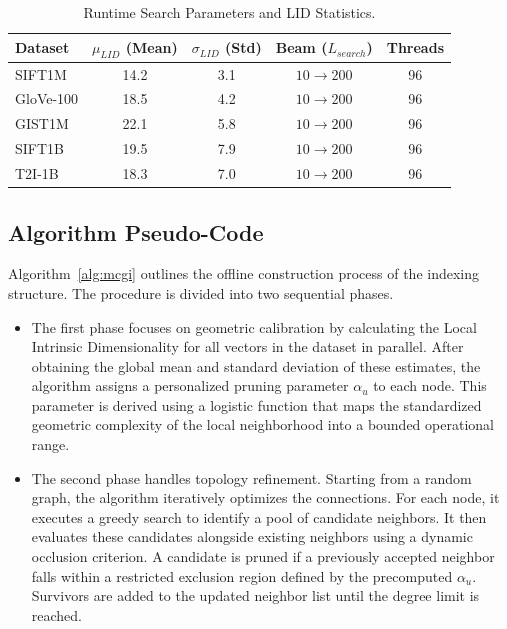 \documentclass{article}
\theoremstyle{plain}
\theoremstyle{definition}
\theoremstyle{remark}
\begin{document}
\begin{table}[h]
\centering
\small 
\caption{Runtime Search Parameters and LID Statistics. 
}
\label{tab:search_params}
\begin{tabular}{lcccc}
\toprule
Dataset & $\mu_{LID}$ (Mean) & $\sigma_{LID}$ (Std) & Beam ($L_{search}$) & Threads \\
\midrule
SIFT1M    & 14.2 & 3.1 & $10 \to 200$ & 96 \\
GloVe-100 & 18.5 & 4.2 & $10 \to 200$ & 96 \\
GIST1M    & 22.1 & 5.8 & $10 \to 200$ & 96 \\
SIFT1B    & 19.5 & 7.9 & $10 \to 200$ & 96 \\
T2I-1B    & 18.3 & 7.0 & $10 \to 200$ & 96 \\
\bottomrule
\end{tabular}
\end{table}

\subsection{Algorithm Pseudo-Code}
\label{appendix:alg}

Algorithm~\ref{alg:mcgi} outlines the offline construction process of the indexing structure. The procedure is divided into two sequential phases. 
\begin{itemize}
    \item The first phase focuses on geometric calibration by calculating the Local Intrinsic Dimensionality for all vectors in the dataset in parallel. After obtaining the global mean and standard deviation of these estimates, the algorithm assigns a personalized pruning parameter $\alpha_u$ to each node. This parameter is derived using a logistic function that maps the standardized geometric complexity of the local neighborhood into a bounded operational range. 
    \item The second phase handles topology refinement. Starting from a random graph, the algorithm iteratively optimizes the connections. For each node, it executes a greedy search to identify a pool of candidate neighbors. It then evaluates these candidates alongside existing neighbors using a dynamic occlusion criterion. A candidate is pruned if a previously accepted neighbor falls within a restricted exclusion region defined by the precomputed $\alpha_u$. Survivors are added to the updated neighbor list until the degree limit is reached.
\end{itemize}
\end{document}

